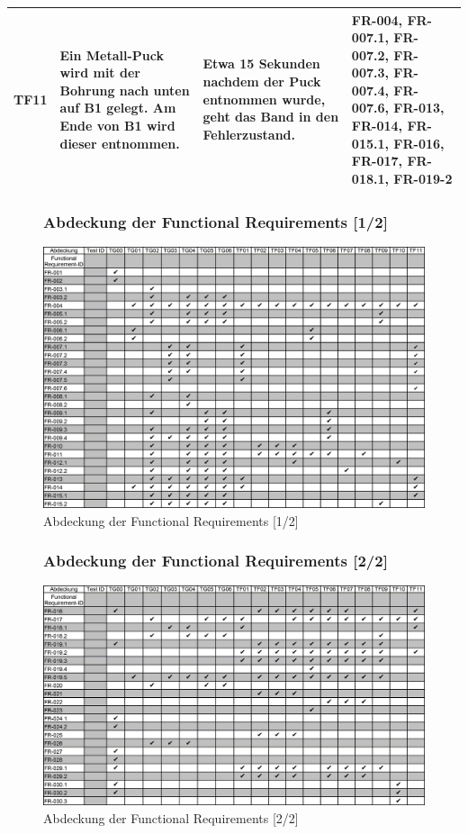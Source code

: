\documentclass[oneside,a4paper,titlepage]{scrartcl}              %
\begin{document}
\begin{small}
\begin{center}
\begin{longtable}{|c|p{4cm}|p{6cm}|C{3cm}|}
      \hline
      TF11 & Ein Metall-Puck wird mit der Bohrung nach unten auf B1 gelegt. Am Ende von B1 wird dieser entnommen. & Etwa 15 Sekunden nachdem der Puck entnommen wurde, geht das Band in den Fehlerzustand. & FR-004, FR-007.1, FR-007.2, FR-007.3, FR-007.4, FR-007.6, FR-013, FR-014, FR-015.1, FR-016, FR-017, FR-018.1, FR-019-2\\
      \hline
    \end{longtable}
  \end{center}
\end{small}

\begin{figure}[p]
  \subsubsection{Abdeckung der Functional Requirements [1/2]}
  \centering\includegraphics[angle=90,scale=0.305]{imgs/Req_Test_Abdeckung_1.png}
  \caption{Abdeckung der Functional Requirements [1/2]}
\end{figure}

\begin{figure}[p]
  \subsubsection{Abdeckung der Functional Requirements [2/2]}
  \centering\includegraphics[angle=90,scale=0.305]{imgs/Req_Test_Abdeckung_2.png}
  \caption{Abdeckung der Functional Requirements [2/2]}
\end{figure}
\end{document}
